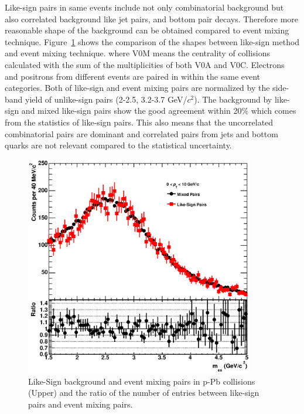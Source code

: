 {Like-sign pairs in same events include not only combinatorial background but also correlated background like jet pairs, and bottom pair decays. 
Therefore more reasonable shape of the background can be obtained compared to event mixing technique. 
Figure~\ref{fig_4_lsmix} shows the comparison of the shapes between like-sign method and event mixing technique.
where V0M means the centrality of collisions calculated with the sum of the multiplicities of both V0A and V0C. 
Electrons and positrons from different events are paired in within the same event categories. 
Both of like-sign and event mixing pairs are normalized by the side-band yield of unlike-sign pairs (2-2.5, 3.2-3.7 GeV/$c^{2}$).
The background by like-sign and mixed like-sign pairs show the good agreement within 20\% which comes from the statistics of like-sign pairs.
This also means that the uncorrelated combinatorial pairs are dominant and correlated pairs from jets and bottom quarks are not relevant compared to the statistical uncertainty.
\begin{figure}[!h]
  \centering
  \includegraphics[width=10cm]{chap4/figure/SignalExtraction/BGComparison_MB.eps}
  \caption{Like-Sign background and event mixing pairs in p-Pb collisions (Upper) and the ratio of the number of entries between like-sign pairs and event mixing pairs. }
  \label{fig_4_lsmix}
\end{figure}

}
